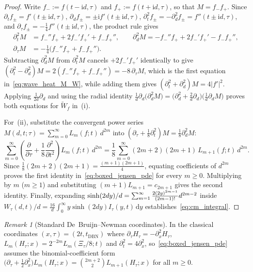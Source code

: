 \documentclass[11pt,reqno]{amsart}
\theoremstyle{plain}
\theoremstyle{definition}
\theoremstyle{remark}
\newtheorem{remark}[theorem]{Remark}
\numberwithin{equation}{section}
\newcommand{\dd}{\,\mathrm{d}}
\newcommand{\ii}{\mathrm{i}}
\newcommand{\fac}{\mathclose{\mathchar"0021}}
\begin{document}
\begin{proof}
Write $f_- := f(t - \ii d,\tau)$ and $f_+ := f(t + \ii d,\tau)$, so that $M = f_- f_+$. Since $\partial_t f_\pm = f'(t \pm \ii d,\tau)$, $\partial_d f_\pm = \pm\ii f'(t \pm \ii d,\tau)$, $\partial_t^2 f_\pm = -\partial_d^2 f_\pm = f''(t \pm \ii d,\tau)$, and $\partial_\tau f_\pm = -\frac{1}{4}f''(t \pm \ii d,\tau)$, the product rule gives
\[
\begin{aligned}
\partial_t^2 M &= f_-'' f_+ + 2f_-' f_+' + f_- f_+'' , \qquad \partial_d^2 M = -f_-'' f_+ + 2f_-' f_+' - f_- f_+'' , \\
\partial_\tau M &= -\frac{1}{4}\bigl(f_-'' f_+ + f_- f_+''\bigr).
\end{aligned}
\]
Subtracting $\partial_d^2 M$ from $\partial_t^2 M$ cancels $+2f_-' f_+'$ identically to give $(\partial_t^2 - \partial_d^2)M = 2(f_-'' f_+ + f_- f_+'') = -8\,\partial_\tau M$, which is the first equation in~\eqref{eq:wave_heat_M_W}, while adding them gives $(\partial_t^2 + \partial_d^2)M = 4\lvert f'\rvert^2$. Applying $\frac{1}{2d}\partial_d$ and using the radial identity $\frac{1}{d}\partial_d\bigl(\partial_d^2 M\bigr) = \bigl(\partial_d^2 + \frac{2}{d}\partial_d\bigr)\bigl(\frac{1}{d}\partial_d M\bigr)$ proves both equations for $\widetilde{W}_f$ in~(i).

For~(ii), substitute the convergent power series $M(d,t;\tau) = \sum_{m=0}^\infty L_m(f; t)\,d^{2m}$ into $(\partial_\tau + \frac{1}{8}\partial_t^2)M = \frac{1}{8}\partial_d^2 M$:
\[
\sum_{m=0}^{\infty} \left(\frac{\partial}{\partial\tau} + \frac{1}{8}\frac{\partial^2}{\partial t^2}\right) L_m(f; t)\,d^{2m} = \frac{1}{8}\sum_{m=0}^{\infty} (2m + 2)(2m + 1)\,L_{m+1}(f; t)\,d^{2m}.
\]
Since $\frac{1}{8}(2m + 2)(2m + 1) = \frac{(m + 1)(2m + 1)}{4}$, equating coefficients of $d^{2m}$ proves the first identity in~\eqref{eq:boxed_jensen_pde} for every $m \ge 0$. Multiplying by $m$ ($m \ge 1$) and substituting $(m + 1)L_{m+1} = c_{2m+1}$ gives the second identity. Finally, expanding $\sinh(2dy)/d = \sum_{m=1}^\infty \frac{2(2y)^{2m-1}}{(2m-1)\fac}d^{2m-2}$ inside $W_\tau(d,t)/d = \frac{16}{d}\int_0^\infty y\sinh(2dy)I_\tau(y,t)\dd y$ establishes~\eqref{eq:cm_integral}.
\end{proof}

\begin{remark}[Standard De~Bruijn--Newman coordinates]\label{rem:dbn_coords}
In the classical coordinates $(x, \tau) = (2t, t_{\mathrm{DBN}})$ where $\partial_\tau H_\tau = -\partial_x^2 H_\tau$, $L_m(H_\tau; x) = 2^{-2m}L_m(\Xi_\tau/8; t)$ and $\partial_t^2 = 4\partial_x^2$, so~\eqref{eq:boxed_jensen_pde} assumes the binomial-coefficient form $\bigl(\partial_\tau + \frac{1}{2}\partial_x^2\bigr)L_m(H_\tau; x) = \binom{2m + 2}{2}L_{m+1}(H_\tau; x)$ for all $m \ge 0$.
\end{remark}
\end{document}
